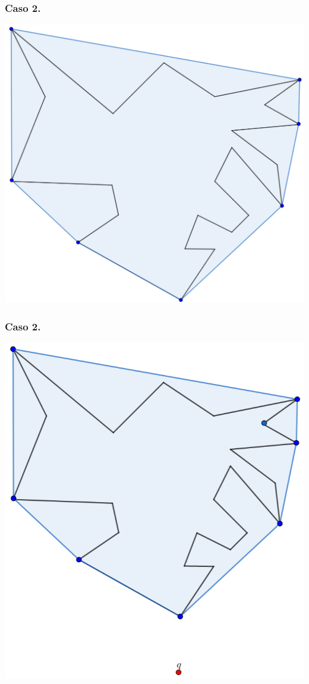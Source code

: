 \begin{frame}
  \frametitle{Caso 2.}
  \centering \includegraphics[width=0.50 \paperwidth]{images/CasosQExterno/P01.png}
\end{frame}

\begin{frame}
  \frametitle{Caso 2.}
  \centering \includegraphics[width=0.50 \paperwidth]{images/CasosQExterno/P02F.png}
\end{frame}

